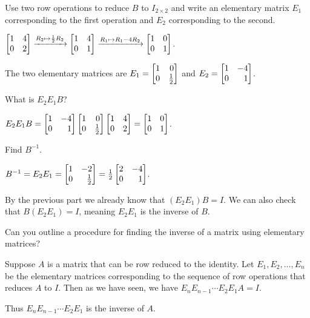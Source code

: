 	\begin{parts}
		\item Use two row operations to reduce $B$ to $I_{2\times 2}$ and write
			an elementary matrix $E_1$ corresponding to the first operation and
			$E_2$ corresponding to the second.
			\begin{solution}
				$\mat{1&4\\0&2}\xrightarrow{R_2\mapsto \frac{1}{2}R_2}\mat{1&4\\0&1}
				\xrightarrow{R_1\mapsto R_1-4R_2}\mat{1&0\\0&1}$.

				The two elementary matrices are $E_1=\mat{1&0\\0&\frac{1}{2}}$
				and $E_2=\mat{1&-4\\0&1}$.
			\end{solution}
		\item What is $E_2E_1B$?
			\begin{solution}
				$E_2E_1B=\mat{1&-4\\0&1}\mat{1&0\\0&\frac{1}{2}}\mat{1 &4\\0 &2}=\mat{1&0\\0&1}$.
			\end{solution}
		\item Find $B^{-1}$.
			\begin{solution}
				$B^{-1}=E_2E_1=\mat{1&-2\\0&\frac{1}{2}}=\frac{1}{2}\mat{2&-4\\0&1}$.

				By the previous part we already know that $(E_2E_1)B=I$. We can also
				check that $B(E_2E_1)=I$, meaning $E_2E_1$ is the inverse of $B$.
			\end{solution}
		\item Can you outline a procedure for finding the inverse of a matrix
		using elementary matrices?
			\begin{solution}
				Suppose $A$ is a matrix that can be row reduced to the identity.
				Let $E_1, E_2, \dots, E_n$ be the elementary matrices corresponding
				to the sequence of row operations that reduces $A$ to $I$. Then
				as we have seen, we have $E_n E_{n-1} \cdots E_2 E_1 A = I$.

				Thus $E_n E_{n-1} \cdots E_2 E_1$ is the inverse of $A$.
			\end{solution}
	\end{parts}

